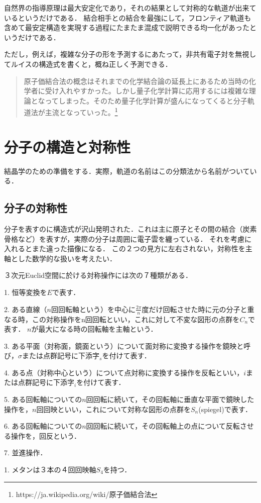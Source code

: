 \documentclass[uplatex, dvipdfmx]{jsreport}
\begin{document}
自然界の指導原理は最大安定化であり，それの結果として対称的な軌道が出来ているというだけである．
結合相手との結合を最強にして，フロンティア軌道も含めて最安定構造を実現する過程にたまたま混成で説明できる均一化があったというだけである．

ただし，例えば，複雑な分子の形を予測するにあたって，非共有電子対を無視してルイスの構造式を書くと，概ね正しく予測できる．

\begin{quotation}
    原子価結合法の概念はそれまでの化学結合論の延長上にあるため当時の化学者に受け入れやすかった。しかし量子化学計算に応用するには複雑な理論となってしまった。そのため量子化学計算が盛んになってくると分子軌道法が主流となっていった。\footnote{https://ja.wikipedia.org/wiki/原子価結合法}
\end{quotation}

\section{分子の構造と対称性}\label{section-language-for-molecules}
結晶学のための準備をする．実際，軌道の名前はこの分類法から名前がついている．

\subsection{分子の対称性}
分子を表すのに構造式が沢山発明された．これは主に原子とその間の結合（炭素骨格など）を表すが，実際の分子は周囲に電子雲を纏っている．
それを考慮に入れるとまた違った描像になる．
この２つの見方に左右されない，対称性を主軸とした数学的な扱いを考えたい．

\begin{notation}３次元Euclid空間に於ける対称操作には次の７種類がある．

    1. 恒等変換を$E$で表す．
    
    2. ある直線（$n$回回転軸という）を中心に$\frac{2\pi}{n}$度だけ回転させた時に元の分子と重なる時，この対称操作をn回回転といい，これに対して不変な図形の点群を$C_n$で表す．
    $n$が最大になる時の回転軸を主軸という．

    3. ある平面（対称面，鏡面という）について面対称に変換する操作を鏡映と呼び，$\sigma$または点群記号に下添字${}_s$を付けて表す．

    4. ある点（対称中心という）について点対称に変換する操作を反転といい，$i$または点群記号に下添字${}_i$を付けて表す．

    5. ある回転軸についての$n$回回転に続いて，その回転軸に垂直な平面で鏡映した操作を，$n$回回映といい，これについて対称な図形の点群を$S_n$(spiegel)で表す．

    6. ある回転軸についての$n$回回転に続いて，その回転軸上の点について反転させる操作を，回反という．

    7. 並進操作．
\end{notation}
\begin{example}
    1. メタンは３本の４回回映軸$S_4$を持つ．
\end{example}
\end{document}
